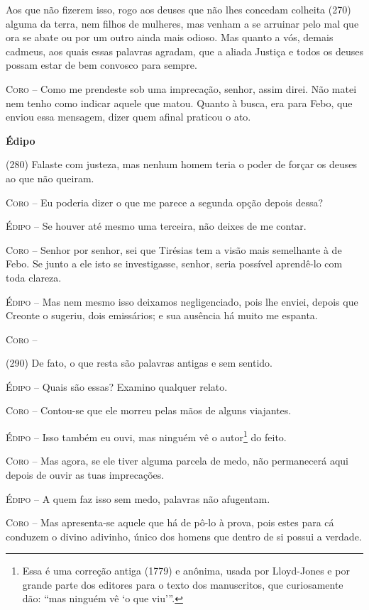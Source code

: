Aos que não fizerem isso, rogo aos deuses que não lhes concedam colheita
(270) alguma da terra, nem filhos de mulheres, mas venham a se arruinar
pelo mal que ora se abate ou por um outro ainda mais odioso. Mas quanto
a vós, demais cadmeus, aos quais essas palavras agradam, que a aliada
Justiça e todos os deuses possam estar de bem convosco para sempre.

\textsc{Coro} --   Como me prendeste sob uma imprecação, senhor, assim direi. Não matei nem
tenho como indicar aquele que matou. Quanto à busca, era para Febo, que
enviou essa mensagem, dizer quem afinal praticou o ato.

\textbf{Édipo} 

(280) Falaste com justeza, mas nenhum homem teria o poder de forçar os
deuses ao que não queiram.

\textsc{Coro} --   Eu poderia dizer o que me parece a segunda opção depois dessa?

\textsc{Édipo} --   Se houver até mesmo uma terceira, não deixes de me contar.

\textsc{Coro} --   Senhor por senhor, sei que Tirésias tem a visão mais semelhante à de
Febo. Se junto a ele isto se investigasse, senhor, seria possível
aprendê-lo com toda clareza.

\textsc{Édipo} --   Mas nem mesmo isso deixamos negligenciado, pois lhe enviei, depois que
Creonte o sugeriu, dois emissários; e sua ausência há muito me espanta.

\textsc{Coro} --  

(290) De fato, o que resta são palavras antigas e sem sentido.

\textsc{Édipo} --   Quais são essas? Examino qualquer relato.

\textsc{Coro} --   Contou-se que ele morreu pelas mãos de alguns viajantes.

\textsc{Édipo} --   Isso também eu ouvi, mas ninguém vê o autor\footnote{Essa é uma correção
  antiga (1779) e anônima, usada por Lloyd-Jones e por grande parte dos
  editores para o texto dos manuscritos, que curiosamente dão: ``mas
  ninguém vê `o que viu'''.} do feito.

\textsc{Coro} --   Mas agora, se ele tiver alguma parcela de medo, não permanecerá aqui
depois de ouvir as tuas imprecações.

\textsc{Édipo} --   A quem faz isso sem medo, palavras não afugentam.

\textsc{Coro} --   Mas apresenta-se aquele que há de pô-lo à prova, pois estes para cá
conduzem o divino adivinho, único dos homens que dentro de si possui a
verdade.

